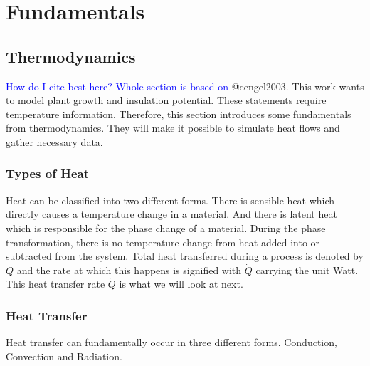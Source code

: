 \chapter{Fundamentals}
\label{chap:fundamentals}

\section{Thermodynamics}
\textcolor{Blue}{How do I cite best here? Whole section is based on} @cengel2003.
This work wants to model plant growth and insulation potential.
These statements require temperature information.
Therefore, this section introduces some fundamentals from thermodynamics.
They will make it possible to simulate heat flows and gather necessary data.



\subsection{Types of Heat}
Heat can be classified into two different forms.
There is sensible heat which directly causes a temperature change in a material.
And there is latent heat which is responsible for the phase change of a material.
During the phase transformation, there is no temperature change from heat added into or subtracted from the system.
Total heat transferred during a process is denoted by $Q$ and the rate at which this happens is signified with $\dot{Q}$ carrying the unit Watt.
This heat transfer rate $\dot{Q}$ is what we will look at next.

\subsection{Heat Transfer}
\label{sub:heat-transfer}
Heat transfer can fundamentally occur in three different forms.
Conduction, Convection and Radiation.

